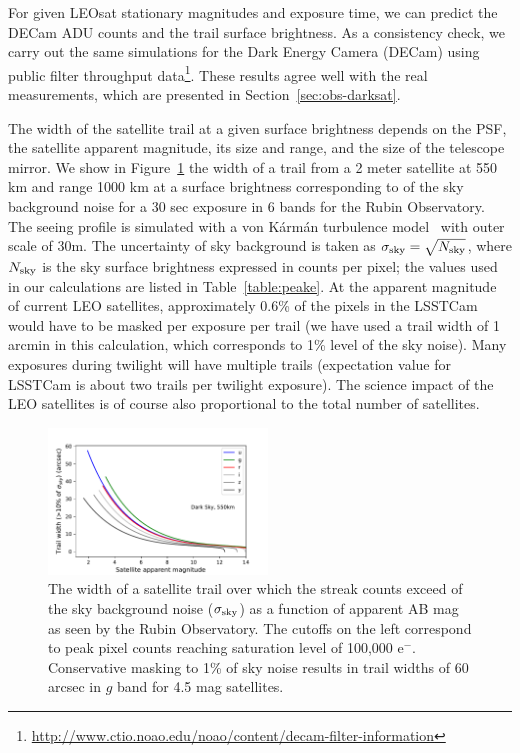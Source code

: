 \documentclass[twocolumn,trackchanges]{aastex63}
\begin{document}

For given LEOsat stationary magnitudes and exposure time, we can predict the DECam ADU counts and the trail surface brightness.
As a consistency check, we carry out the same simulations for the Dark Energy Camera (DECam) using public filter throughput data\footnote{\url{http://www.ctio.noao.edu/noao/content/decam-filter-information}}.  These results agree well with the real measurements, which are presented in Section~\ref{sec:obs-darksat}. 

The width of the satellite trail at a given surface brightness depends on the PSF, the satellite apparent magnitude, its size and range, and the size of the telescope mirror. We show in Figure~\ref{fig:widthsim550} the width of  a trail from a 2 meter satellite at 550 km and range 1000 km at a surface brightness corresponding to  of the sky background noise for a 30 sec exposure in 6 bands for the Rubin Observatory.  The seeing profile is simulated with a von K\'{a}rm\'{a}n turbulence model~\citep{vk1, vk2} with outer scale of 30m.
The uncertainty of sky  background is taken as $\sigma_{\rm sky}=\sqrt{N_{\rm sky}}$, where $N_{\rm sky}$ is the sky surface brightness expressed in counts per pixel; the values used in our calculations are listed in Table~\ref{table:peake}.  
At the apparent magnitude of current LEO satellites, approximately 0.6\% of the pixels in the LSSTCam  would have to be masked per exposure per trail (we have used a trail width of 1 arcmin in this calculation, which corresponds to 1\% level of the sky noise).  Many  exposures during twilight will have multiple trails (expectation value for LSSTCam is about two trails per twilight exposure). The science impact of the LEO satellites is of course also proportional to the total number of satellites.


\begin{figure}[ht]
\includegraphics[width=0.52\textwidth]{width_by_band_550km_darkSky.pdf}
\caption{The width of a satellite trail over which the streak counts exceed  of the sky background noise ($\sigma_{\rm sky}$) as a function of apparent AB mag as seen by the Rubin Observatory. The cutoffs on the left correspond to peak pixel counts reaching saturation level of 100,000 e$^-$. Conservative masking to 1\% of sky noise results in trail widths of 60 arcsec in $g$ band for 4.5 mag satellites. 
\label{fig:widthsim550}}
\end{figure}  
\end{document}
